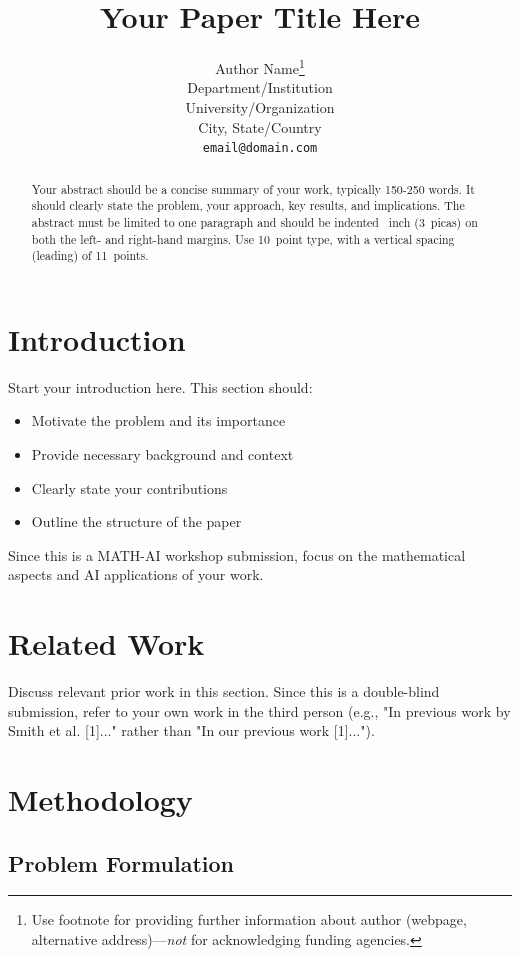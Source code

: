 \documentclass{article}
\title{Your Paper Title Here}
\author{%
  Author Name\thanks{Use footnote for providing further information
    about author (webpage, alternative address)---\emph{not} for acknowledging
    funding agencies.} \\
  Department/Institution \\
  University/Organization \\
  City, State/Country \\
  \texttt{email@domain.com} \\
}
\begin{document}
\maketitle

\begin{abstract}
  Your abstract should be a concise summary of your work, typically 150-250 words. 
  It should clearly state the problem, your approach, key results, and implications. 
  The abstract must be limited to one paragraph and should be indented ~inch 
  (3~picas) on both the left- and right-hand margins. Use 10~point type, with a vertical 
  spacing (leading) of 11~points.
\end{abstract}

\section{Introduction}

Start your introduction here. This section should:

\begin{itemize}
\item Motivate the problem and its importance
\item Provide necessary background and context
\item Clearly state your contributions
\item Outline the structure of the paper
\end{itemize}

Since this is a MATH-AI workshop submission, focus on the mathematical aspects and AI applications of your work.

\section{Related Work}

Discuss relevant prior work in this section. Since this is a double-blind submission, refer to your own work in the third person (e.g., "In previous work by Smith et al. [1]..." rather than "In our previous work [1]...").

\section{Methodology}

\subsection{Problem Formulation}
\end{document}
